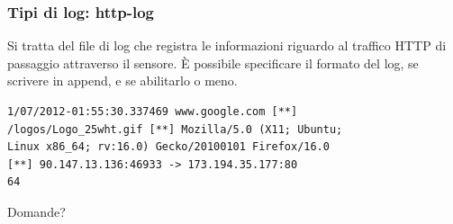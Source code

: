 \documentclass[aspectratio=169]{beamer}
\begin{document}
    \begin{frame}[fragile]
      \frametitle{Tipi di log: http-log}%
        Si tratta del file di log che registra le informazioni riguardo al traffico HTTP di passaggio attraverso il sensore. È possibile specificare il formato del log, se scrivere in append, e se abilitarlo o meno.
        \vskip 0.3cm
        \begin{lstlisting}
1/07/2012-01:55:30.337469 www.google.com [**]
/logos/Logo_25wht.gif [**] Mozilla/5.0 (X11; Ubuntu;
Linux x86_64; rv:16.0) Gecko/20100101 Firefox/16.0
[**] 90.147.13.136:46933 -> 173.194.35.177:80
64
        \end{lstlisting}
    \end{frame}
	\startlayoutpage
	\begin{frame}
		\begin{center}
			\Huge Domande?
		\end{center}
	\end{frame}
	\stoplayoutpage
\end{document}
